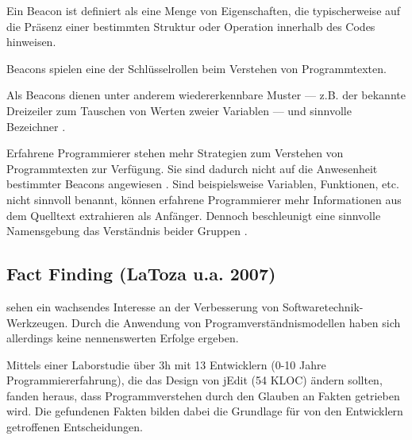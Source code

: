 \begin{furtherreading}[frametitle={Definition: Beacons}]
\label{def:beacon}
Ein Beacon ist definiert als eine Menge von Eigenschaften, die typischerweise auf die Präsenz einer bestimmten Struktur oder Operation innerhalb des Codes hinweisen. \citep{Brooks:1983fj,Wiedenbeck:1986fc}

Beacons spielen eine der Schlüsselrollen beim Verstehen von Programmtexten. \citep{Crosby02theroles}

Als Beacons dienen unter anderem wiedererkennbare Muster \citep{Wiedenbeck:1986fc} --- z.B. der bekannte Dreizeiler zum Tauschen von Werten zweier Variablen --- und sinnvolle Bezeichner \citep{Teasley:1994gr,Gellenbeck:1991vn}.

Erfahrene Programmierer stehen mehr Strategien zum Verstehen von Programmtexten zur Verfügung. Sie sind dadurch nicht auf die Anwesenheit bestimmter Beacons angewiesen \citep{Teasley:1994gr}. Sind beispielsweise Variablen, Funktionen, etc. nicht sinnvoll benannt, können erfahrene Programmierer mehr Informationen aus dem Quelltext extrahieren als Anfänger. Dennoch beschleunigt eine sinnvolle Namensgebung das Verständnis beider Gruppen \citep{Crosby02theroles}. 
\end{furtherreading}



\subsection{Fact Finding (LaToza u.a. 2007)}
\label{sec:FactFinding}

\cite{LaToza:2007fj} sehen ein wachsendes Interesse an der Verbesserung von Softwaretechnik-Werkzeugen. Durch die Anwendung von Programverständnismodellen haben sich allerdings keine nennenswerten Erfolge ergeben.
 
Mittels einer Laborstudie über 3h mit 13 Entwicklern (0-10 Jahre Programmiererfahrung), die das Design von jEdit (54 KLOC) ändern sollten, fanden \cite{LaToza:2007fj} heraus, dass Programmverstehen durch den Glauben an Fakten getrieben wird. Die gefundenen Fakten bilden dabei die Grundlage für von den Entwicklern getroffenen Entscheidungen.

